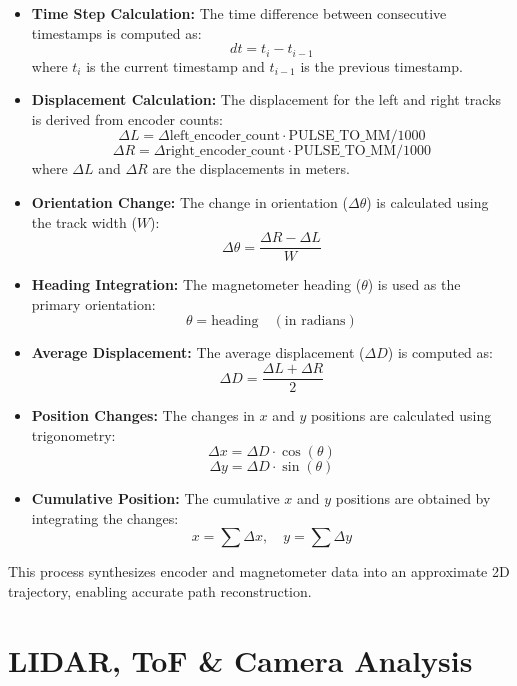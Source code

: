 \documentclass[a4paper]{article}
\begin{document}
\begin{itemize}
    \item \textbf{Time Step Calculation:}
    The time difference between consecutive timestamps is computed as:
    \[
    dt = t_i - t_{i-1}
    \]
    where \( t_i \) is the current timestamp and \( t_{i-1} \) is the previous timestamp.

    \item \textbf{Displacement Calculation:}
    The displacement for the left and right tracks is derived from encoder counts:
    \[
    \Delta L = \Delta \text{left\_encoder\_count} \cdot \text{PULSE\_TO\_MM} / 1000
    \]
    \[
    \Delta R = \Delta \text{right\_encoder\_count} \cdot \text{PULSE\_TO\_MM} / 1000
    \]
    where \( \Delta L \) and \( \Delta R \) are the displacements in meters.

    \item \textbf{Orientation Change:}
    The change in orientation (\( \Delta \theta \)) is calculated using the track width (\( W \)):
    \[
    \Delta \theta = \frac{\Delta R - \Delta L}{W}
    \]

    \item \textbf{Heading Integration:}
    The magnetometer heading (\( \theta \)) is used as the primary orientation:
    \[
    \theta = \text{heading} \quad (\text{in radians})
    \]

    \item \textbf{Average Displacement:}
    The average displacement (\( \Delta D \)) is computed as:
    \[
    \Delta D = \frac{\Delta L + \Delta R}{2}
    \]

    \item \textbf{Position Changes:}
    The changes in \( x \) and \( y \) positions are calculated using trigonometry:
    \[
    \Delta x = \Delta D \cdot \cos(\theta)
    \]
    \[
    \Delta y = \Delta D \cdot \sin(\theta)
    \]

    \item \textbf{Cumulative Position:}
    The cumulative \( x \) and \( y \) positions are obtained by integrating the changes:
    \[
    x = \sum \Delta x, \quad y = \sum \Delta y
    \]
\end{itemize}

This process synthesizes encoder and magnetometer data into an approximate 2D trajectory, enabling accurate path reconstruction.

\clearpage
\section{LIDAR, ToF \& Camera Analysis}
\end{document}
